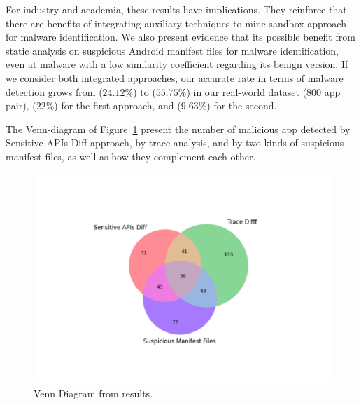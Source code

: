 For industry and academia, these results have implications. They reinforce that there are benefits of integrating auxiliary techniques to mine sandbox approach for malware identification. We also present evidence that its possible benefit from static analysis on suspicious Android manifest files for malware identification, even at malware with a low similarity coefficient regarding its benign version. If we consider both integrated approaches, our accurate rate in terms of malware detection grows from ($24.12\%$) to ($55.75\%$) in our real-world dataset (800 app pair), ($22\%$) for the first approach, and ($9.63\%$) for the second.

The Venn-diagram of Figure~\ref{fig:vennDiagram} present the number of malicious app detected by Sensitive APIs Diff approach, by trace analysis, and by two kinds of suspicious manifest files, as well as how they complement each other.

\begin{figure}[ht]
\centering
\includegraphics[scale=0.35]{images/vennDiagram.pdf}
\caption{Venn Diagram from results.}
 \label{fig:vennDiagram}
\end{figure}



